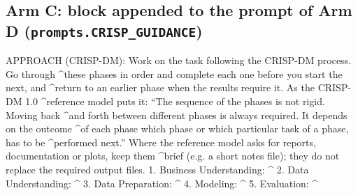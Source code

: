 \subsection*{Arm C: block appended to the prompt of Arm D (\texttt{prompts.CRISP\_GUIDANCE})}
\begin{AppCPrompt}
APPROACH (CRISP-DM): Work on the task following the CRISP-DM process. Go through
\AppCCont@^these phases in order and complete each one before you start the next, and
\AppCCont@^return to an earlier phase when the results require it. As the CRISP-DM 1.0
\AppCCont@^reference model puts it: “The sequence of the phases is not rigid. Moving back
\AppCCont@^and forth between different phases is always required. It depends on the outcome
\AppCCont@^of each phase which phase or which particular task of a phase, has to be
\AppCCont@^performed next.”
Where the reference model asks for reports, documentation or plots, keep them
\AppCCont@^brief (e.g. a short notes file); they do not replace the required output files.
1. Business Understanding:
\AppCCrisp@bu^
2. Data Understanding:
\AppCCrisp@du^
3. Data Preparation:
\AppCCrisp@prep^
4. Modeling:
\AppCCrisp@model^
5. Evaluation:
\AppCCrisp@eval^
\end{AppCPrompt}
